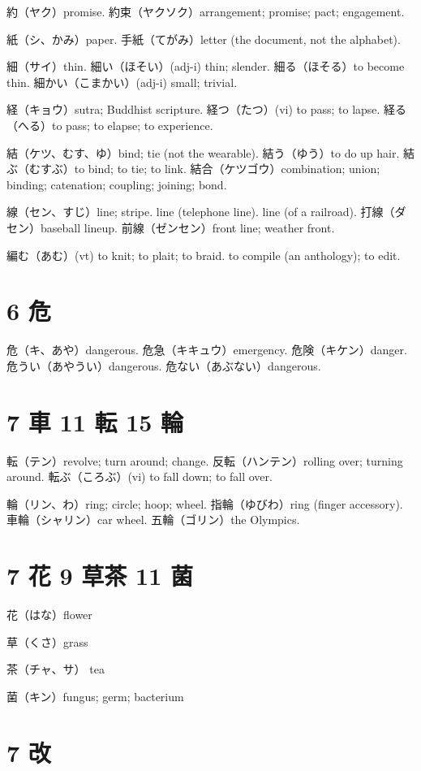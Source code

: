 約（ヤク）promise.
約束（ヤクソク）arrangement; promise; pact; engagement.

紙（シ、かみ）paper.
手紙（てがみ）letter (the document, not the alphabet).

細（サイ）thin.
細い（ほそい）(adj-i) thin; slender.
細る（ほそる）to become thin.
細かい（こまかい）(adj-i) small; trivial.

経（キョウ）sutra; Buddhist scripture.
経つ（たつ）(vi) to pass; to lapse.
経る（へる）to pass; to elapse; to experience.

結（ケツ、むす、ゆ）bind; tie (not the wearable).
結う（ゆう）to do up hair.
結ぶ（むすぶ）to bind; to tie; to link.
結合（ケツゴウ）combination; union; binding; catenation; coupling; joining; bond.

線（セン、すじ）line; stripe.
line (telephone line).
line (of a railroad).
打線（ダセン）baseball lineup.
前線（ゼンセン）front line; weather front.

編む（あむ）(vt)
to knit; to plait; to braid.
to compile (an anthology); to edit.

\section{6 危}

危（キ、あや）dangerous.
危急（キキュウ）emergency.
危険（キケン）danger.
危うい（あやうい）dangerous.
危ない（あぶない）dangerous.

\section{7 車 11 転 15 輪}

転（テン）revolve; turn around; change.
反転（ハンテン）rolling over; turning around.
転ぶ（ころぶ）(vi) to fall down; to fall over.

輪（リン、わ）ring; circle; hoop; wheel.
指輪（ゆびわ）ring (finger accessory).
車輪（シャリン）car wheel.
五輪（ゴリン）the Olympics.

\section{7 花 9 草茶 11 菌}

花（はな）flower

草（くさ）grass

茶（チャ、サ） tea

菌（キン）fungus; germ; bacterium

\section{7 改}

